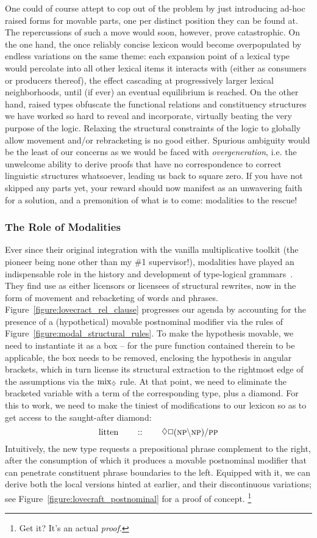One could of course attept to cop out of the problem by just introducing ad-hoc raised forms for movable parts, one per distinct position they can be found at. 
The repercussions of such a move would soon, however, prove catastrophic.
On the one hand, the once reliably concise lexicon would become overpopulated by endless variations on the same theme: each expansion point of a lexical type would percolate into all other lexical items it interacts with (either as consumers or producers thereof), the effect cascading at progressively larger lexical neighborhoods, until (if ever) an eventual equilibrium is reached.
On the other hand, raised types obfuscate the functional relations and constituency structures we have worked so hard to reveal and incorporate, virtually beating the very purpose of the logic.
Relaxing the structural constraints of the logic to globally allow movement and/or rebracketing is no good either.
Spurious ambiguity would be the least of our concerns as we would be faced with \textit{overgeneration}, i.e. the unwelcome ability to derive proofs that have no correspondence to correct linguistic structures whatsoever, leading us back to square zero.
If you have not skipped any parts yet, your reward should now manifest as an unwavering faith for a solution, and a premonition of what is to come: modalities to the rescue!

\subsubsection{The Role of Modalities}
Ever since their original integration with the vanilla multiplicative toolkit (the pioneer being none other than my \#1 supervisor!), modalities have played an indispensable role in the history and development of type-logical grammars~\cite{moortgat1996multimodal}.
They find use as either licensors or licensees of structural rewrites, now in the form of movement and rebacketing of words and phrases.
Figure~\ref{figure:lovecract_rel_clause} progresses our agenda by accounting for the presence of a (hypothetical) movable postnominal modifier via the rules of Figure~\ref{figure:modal_structural_rules}.
To make the hypothesis movable, we need to instantiate it as a box -- for the pure function contained therein to be applicable, the box needs to be removed, enclosing the hypothesis in angular brackets, which in turn license its structural extraction to the rightmost edge of the assumptions via the $\rulestyle{mix}_{\diamond}$ rule.
At that point, we need to eliminate the bracketed variable with a term of the corresponding type, plus a diamond.
For this to work, we need to make the tiniest of modifications to our lexicon so as to get access to the saught-after diamond:
\[
	\w{litten} \qquad :: \qquad \diamond\Box (\np\divleft\np)\divright\pp
\]
Intuitively, the new type requests a prepositional phrase complement to the right, after the consumption of which it produces a movable postnominal modifier that can penetrate constituent phrase boundaries to the left.
Equipped with it, we can derive both the local versions hinted at earlier, and their discontinuous variations; see Figure~\ref{figure:lovecraft_postnominal} for a proof of concept.%
\footnote{Get it? It's an actual \textit{proof}.} 

